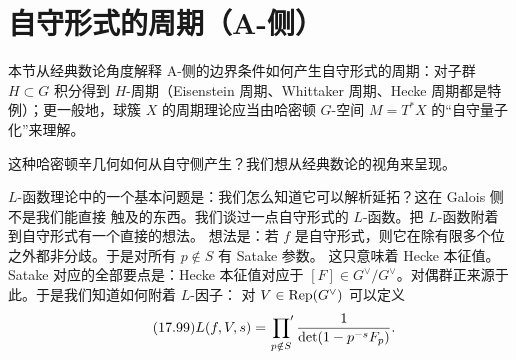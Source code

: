 
\section{自守形式的周期（A-侧）}

\begin{sectionkey}
本节从经典数论角度解释 A-侧的边界条件如何产生自守形式的周期：对子群 $H\subset G$ 积分得到
$H$-周期（Eisenstein 周期、Whittaker 周期、Hecke 周期都是特例）；更一般地，球簇 $X$
的周期理论应当由哈密顿 $G$-空间 $M=T^*X$ 的“自守量子化”来理解。
\end{sectionkey}

这种哈密顿辛几何如何从自守侧产生？我们想从经典数论的视角来呈现。

$L$-函数理论中的一个基本问题是：我们怎么知道它可以解析延拓？这在 Galois 侧不是我们能直接
触及的东西。我们谈过一点自守形式的 $L$-函数。把 $L$-函数附着到自守形式有一个直接的想法。
想法是：若 $f$ 是自守形式，则它在除有限多个位之外都非分歧。于是对所有 $p\notin S$ 有 Satake 参数。
这只意味着 Hecke 本征值。Satake 对应的全部要点是：Hecke 本征值对应于
$[F]\in G^{\vee}/G^{\vee}$。对偶群正来源于此。于是我们知道如何附着 $L$-因子：
对 $V\in\mathrm{Rep}(G^{\vee})$ 可以定义
\begin{equation}\tag{17.99}\label{eq:17.99}
L(f,V,s)=\sideset{}{'}\prod_{p\notin S}\frac{1}{\det(1-p^{-s}F_p)}.
\end{equation}

